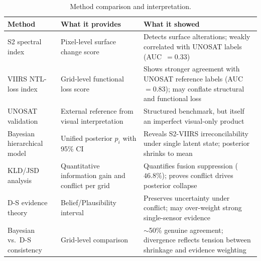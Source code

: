 \documentclass[wcp]{jmlr}
\begin{document}
\begin{table}[htp]
\centering
\caption{Method comparison and interpretation.}
\label{tab:methods}
\begin{tabular}{@{}lp{5cm}p{5cm}@{}}
\toprule
\textbf{Method} & \textbf{What it provides} & \textbf{What it showed} \\
\midrule
S2 spectral index &
  Pixel-level surface change score &
  Detects surface alterations; weakly correlated with UNOSAT labels (AUC~$=0.33$) \\
VIIRS NTL-loss index &
  Grid-level functional loss score &
  Shows stronger agreement with UNOSAT reference labels (AUC~$=0.83$); may conflate
  structural and functional loss \\
UNOSAT validation &
  External reference from visual interpretation &
  Structured benchmark, but itself an imperfect visual-only product \\
Bayesian hierarchical model &
  Unified posterior $p_i$ with 95\% CI &
  Reveals S2-VIIRS irreconcilability under single latent state; posterior shrinks to mean \\
KLD/JSD analysis &
  Quantitative information gain and conflict per grid &
  Quantifies fusion suppression ($46.8\%$); proves conflict drives posterior collapse \\
D-S evidence theory &
  Belief/Plausibility interval &
  Preserves uncertainty under conflict; may over-weight strong single-sensor evidence \\
Bayesian vs.\ D-S consistency &
  Grid-level comparison &
  $\sim$50\% genuine agreement; divergence reflects tension between shrinkage and evidence weighting \\
\bottomrule
\end{tabular}
\end{table}
\end{document}
